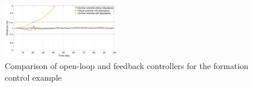 \begin{figure}[t]
	\centering
	\includegraphics[width=0.45\textwidth]{figures/formation_dist2.eps}
	\caption{Comparison of open-loop and feedback controllers for the formation control example}
	\label{fig:formation_distance}
\vspace*{-0.5cm}
\end{figure}
 

%









